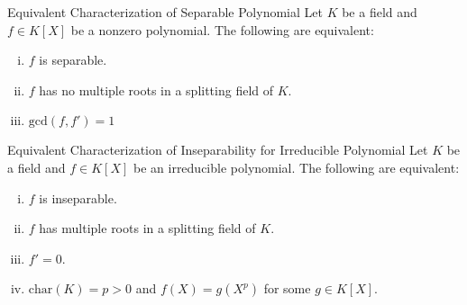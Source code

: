 \begin{proposition}{Equivalent Characterization of Separable Polynomial}{}
    Let $K$ be a field and $f\in K[X]$ be a nonzero polynomial. The following are equivalent:
    \begin{enumerate}[(i)]
        \item $f$ is separable.
        \item $f$ has no multiple roots in a splitting field of $K$.
        \item $\mathrm{gcd}(f,f')= 1$
    \end{enumerate}
\end{proposition}

\begin{proposition}{Equivalent Characterization of Inseparability for Irreducible Polynomial}{}
    Let $K$ be a field and $f\in K[X]$ be an irreducible polynomial. The following are equivalent:
    \begin{enumerate}[(i)]
        \item $f$ is inseparable.
        \item $f$ has multiple roots in a splitting field of $K$.
        \item $f'=0$.
        \item $\mathrm{char}(K)=p>0$ and $f(X)=g(X^p)$ for some $g\in K[X]$.
    \end{enumerate}
\end{proposition}

